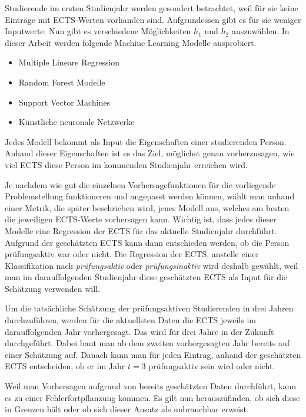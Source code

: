 Studierende im ersten Studienjahr werden gesondert betrachtet, weil f\"ur sie keine Eintr\"age mit ECTS-Werten vorhanden sind.
Aufgrundessen gibt es f\"ur sie weniger Inputwerte.
Nun gibt es verschiedene M\"oglichkeiten $h_1$ und $h_2$ auszuwählen. In dieser Arbeit
werden folgende Machine Learning Modelle ausprobiert.

\begin{itemize}
  \item Multiple Lineare Regression
  \item Random Forest Modelle
  \item Support Vector Machines
  \item K\"unstliche neuronale Netzwerke
\end{itemize}

Jedes Modell bekommt als Input die Eigenschaften einer studierenden Person. Anhand dieser Eigenschaften ist es das Ziel, m\"oglichst genau
vorherzusagen, wie viel ECTS diese Person im kommenden Studienjahr erreichen wird.

Je nachdem wie gut die einzelnen Vorhersagefunktionen für die vorliegende Problemstellung funktioneren
und angepasst werden können, w\"ahlt man anhand einer Metrik, die sp\"ater beschrieben wird, jenes Modell aus, welches
am besten die jeweiligen ECTS-Werte vorhersagen kann.
Wichtig ist, dass jedes dieser Modelle eine Regression der ECTS f\"ur das aktuelle Studienjahr
durchf\"uhrt. Aufgrund der gesch\"atzten ECTS kann dann entschieden werden, ob die Person
pr\"ufungsaktiv war oder nicht. Die Regression der ECTS, anstelle einer Klassifikation nach
\textit{pr\"ufungsaktiv} oder \textit{pr\"ufungsinaktiv} wird deshalb gew\"ahlt, weil man im darauffolgenden Studienjahr diese
gesch\"atzten ECTS als Input f\"ur die Sch\"atzung verwenden will.


Um die tats\"achliche Sch\"atzung der pr\"ufungsaktiven Studierenden in drei Jahren durchzuf\"uhren, werden f\"ur die
aktuellsten Daten die ECTS jeweils im darauffolgenden Jahr vorhergesagt. Das wird f\"ur drei Jahre in der Zukunft durchgef\"uhrt.
Dabei baut man ab dem zweiten vorhergesagten Jahr
bereits auf einer Sch\"atzung auf. Danach kann man f\"ur jeden Eintrag, anhand der gesch\"atzten ECTS entscheiden, ob er im Jahr $t = 3$ pr\"ufungsaktiv sein wird oder nicht.

Weil man Vorhersagen aufgrund von bereits gesch\"atzten Daten durchf\"uhrt, kann es zu einer Fehlerfortpflanzung kommen.
Es gilt nun herauszufinden, ob sich diese in Grenzen h\"alt oder ob sich dieser Ansatz als unbrauchbar erweist.





